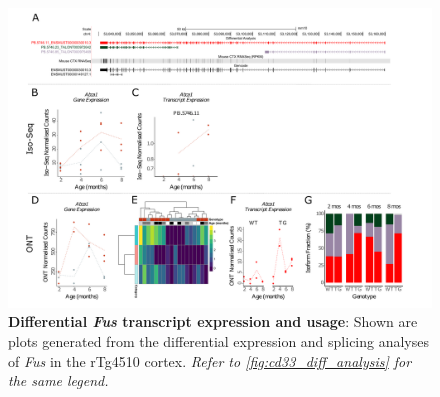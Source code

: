 \begin{landscape}
	\begin{figure}[htp]
		\begin{center}
			\includegraphics[page=9,trim={0 0.5cm 0 1.5cm},scale =0.85]{Figures/TargetGene_DifferentialAnalysis.pdf}
		\end{center}
		\captionsetup{width=1.5\textwidth}
		\caption[Differential \textit{Fus} transcript expression and usage]%
		{\textbf{Differential \textit{Fus} transcript expression and usage}: Shown are plots generated from the differential expression and splicing analyses of \textit{Fus} in the rTg4510 cortex. \textit{Refer to \cref{fig:cd33_diff_analysis} for the same legend.}}   
		\label{fig:Fus_diff_analysis}
	\end{figure}
\end{landscape}

